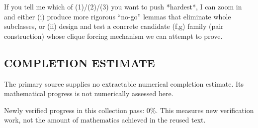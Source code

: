 If you tell me which of (1)/(2)/(3) you want to push *hardest*, I can zoom in and either (i) produce more rigorous “no-go” lemmas that eliminate whole subclasses, or (ii) design and test a concrete candidate (f,g) family (pair construction) whose clique forcing mechanism we can attempt to prove.


\subsection*{COMPLETION ESTIMATE}
The primary source supplies no extractable numerical completion estimate. Its mathematical progress is not numerically assessed here.

Newly verified progress in this collection pass: $0\%$. This measures new verification work, not the amount of mathematics achieved in the reused text.
